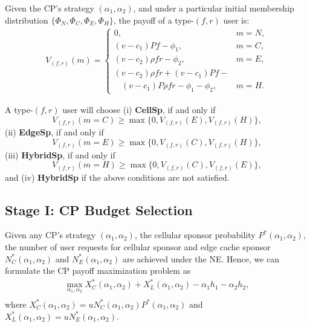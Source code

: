 Given the CP's strategy $(\alpha_1, \alpha_2)$, and under a particular initial membership distribution $\{\Phi_N, \Phi_C, \Phi_E, \Phi_H\}$, the payoff of a type-$(f, r)$ user is:
\begin{equation}\label{equa:userpayoff}
\begin{array}{l}
V_{(f, r)}(m)=
\left\{\begin{array}{ll}
0, & m=N,\\
(v-c_1)Pf-\phi_1, &m= C,\\
(v-c_2)\rho fr-\phi_2, & m=E,\\
 (v-c_2)\rho fr+(v-c_1)Pf-\\
 ~~~~(v-c_1)P\rho fr-\phi_1-\phi_2, & m=H.
\end{array}\right.
\end{array}
\end{equation}


A type-$(f, r)$ user will  choose (i)  \textbf{CellSp}, if and only if
\begin{equation}V_{(f, r)}(m=C)\ge \max\{0, V_{(f, r)}(E), V_{(f, r)}(H)\}, \end{equation}
(ii)   \textbf{EdgeSp}, if and only if
\begin{equation}V_{(f, r)}(m=E)\ge \max\{0, V_{(f, r)}(C), V_{(f, r)}(H)\}, \end{equation}
(iii)   \textbf{HybridSp}, if and only if
\begin{equation}V_{(f, r)}(m=H)\ge \max\{0, V_{(f, r)}(C), V_{(f, r)}(E)\}, \end{equation} 
and (iv) \textbf{HybridSp} if  the above conditions are not satisfied. 
	
\subsection{Stage I: CP Budget Selection}
	Given any CP's strategy $(\alpha_1, \alpha_2)$, the cellular sponsor probability $P^*(\alpha_1, \alpha_2)$, the number of user requests for cellular sponsor and edge cache sponsor $N^*_C(\alpha_1, \alpha_2)$ and $N^*_E(\alpha_1, \alpha_2)$ are achieved under the NE. Hence, we can formulate the CP payoff maximization problem as
	\begin{equation}
	\begin{aligned}
	\max_{\alpha_1, \alpha_2}X^*_C(\alpha_1, \alpha_2)+X^*_L(\alpha_1, \alpha_2)-\alpha_1 h_1-\alpha_2 h_2, \\
	\end{aligned}
	\end{equation}
	where $X^*_C(\alpha_1, \alpha_2)=u N^*_C(\alpha_1, \alpha_2)P^*(\alpha_1, \alpha_2)$
	and \\$X^*_L(\alpha_1, \alpha_2)= u N^*_E(\alpha_1, \alpha_2)$.

